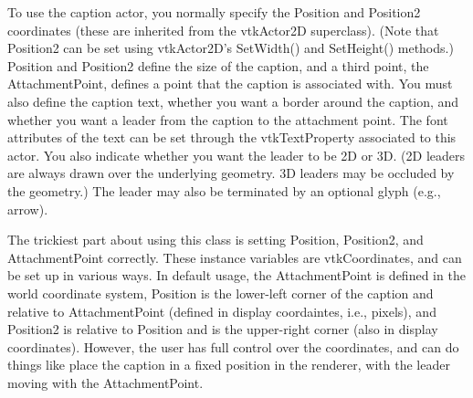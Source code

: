 To use the caption actor, you normally specify the Position and Position2 coordinates (these are inherited from the vtk\-Actor2\-D superclass). (Note that Position2 can be set using vtk\-Actor2\-D's Set\-Width() and Set\-Height() methods.) Position and Position2 define the size of the caption, and a third point, the Attachment\-Point, defines a point that the caption is associated with. You must also define the caption text, whether you want a border around the caption, and whether you want a leader from the caption to the attachment point. The font attributes of the text can be set through the vtk\-Text\-Property associated to this actor. You also indicate whether you want the leader to be 2\-D or 3\-D. (2\-D leaders are always drawn over the underlying geometry. 3\-D leaders may be occluded by the geometry.) The leader may also be terminated by an optional glyph (e.\-g., arrow).

The trickiest part about using this class is setting Position, Position2, and Attachment\-Point correctly. These instance variables are vtk\-Coordinates, and can be set up in various ways. In default usage, the Attachment\-Point is defined in the world coordinate system, Position is the lower-\/left corner of the caption and relative to Attachment\-Point (defined in display coordaintes, i.\-e., pixels), and Position2 is relative to Position and is the upper-\/right corner (also in display coordinates). However, the user has full control over the coordinates, and can do things like place the caption in a fixed position in the renderer, with the leader moving with the Attachment\-Point.

